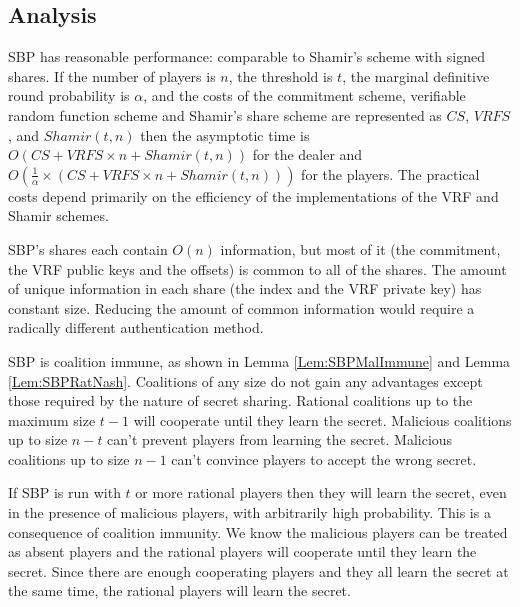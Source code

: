 \documentclass{dalcsthesis}
\begin{document}
\subsection{Analysis}

SBP has reasonable performance: comparable to Shamir's scheme with signed shares. If the number of players is $n$, the threshold is $t$, the marginal definitive round probability is $\alpha$, and the costs of the commitment scheme, verifiable random function scheme and Shamir's share scheme are represented as $CS$, $VRFS$, and $Shamir(t, n)$ then the asymptotic time is $O(CS + VRFS \times n + Shamir(t, n))$ for the dealer and $O(\frac{1}{\alpha} \times (CS + VRFS \times n + Shamir(t, n)))$ for the players. The practical costs depend primarily on the efficiency of the implementations of the VRF and Shamir schemes.

SBP's shares each contain $O(n)$ information, but most of it (the commitment, the VRF public keys and the offsets) is common to all of the shares. The amount of unique information in each share (the index and the VRF private key) has constant size. Reducing the amount of common information would require a radically different authentication method.

SBP is coalition immune, as shown in Lemma \ref{Lem:SBPMalImmune} and Lemma \ref{Lem:SBPRatNash}. Coalitions of any size do not gain any advantages except those required by the nature of secret sharing. Rational coalitions up to the maximum size $t-1$ will cooperate until they learn the secret. Malicious coalitions up to size $n-t$ can't prevent players from learning the secret. Malicious coalitions up to size $n-1$ can't convince players to accept the wrong secret.

If SBP is run with $t$ or more rational players then they will learn the secret, even in the presence of malicious players, with arbitrarily high probability. This is a consequence of coalition immunity. We know the malicious players can be treated as absent players and the rational players will cooperate until they learn the secret. Since there are enough cooperating players and they all learn the secret at the same time, the rational players will learn the secret.
\end{document}
